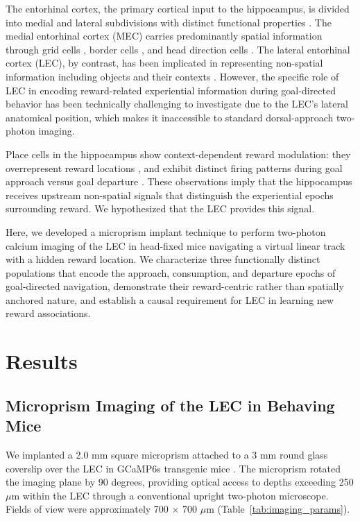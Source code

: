 \documentclass[11pt]{article}
\begin{document}
The entorhinal cortex, the primary cortical input to the hippocampus, is divided into medial and lateral subdivisions with distinct functional properties \citep{witter2017}. The medial entorhinal cortex (MEC) carries predominantly spatial information through grid cells \citep{hafting2005}, border cells \citep{solstad2008}, and head direction cells \citep{sargolini2006}. The lateral entorhinal cortex (LEC), by contrast, has been implicated in representing non-spatial information including objects and their contexts \citep{deshmukh2011, tsao2018, wang2018}. However, the specific role of LEC in encoding reward-related experiential information during goal-directed behavior has been technically challenging to investigate due to the LEC's lateral anatomical position, which makes it inaccessible to standard dorsal-approach two-photon imaging.

Place cells in the hippocampus show context-dependent reward modulation: they overrepresent reward locations \citep{hollup2001}, and exhibit distinct firing patterns during goal approach versus goal departure \citep{gauthier2018}. These observations imply that the hippocampus receives upstream non-spatial signals that distinguish the experiential epochs surrounding reward. We hypothesized that the LEC provides this signal.

Here, we developed a microprism implant technique to perform two-photon calcium imaging of the LEC in head-fixed mice navigating a virtual linear track with a hidden reward location. We characterize three functionally distinct populations that encode the approach, consumption, and departure epochs of goal-directed navigation, demonstrate their reward-centric rather than spatially anchored nature, and establish a causal requirement for LEC in learning new reward associations.

\section{Results}

\subsection{Microprism Imaging of the LEC in Behaving Mice}

We implanted a 2.0 mm square microprism attached to a 3 mm round glass coverslip over the LEC in GCaMP6s transgenic mice \citep{dana2014}. The microprism rotated the imaging plane by 90 degrees, providing optical access to depths exceeding 250 $\mu$m within the LEC through a conventional upright two-photon microscope. Fields of view were approximately 700 $\times$ 700 $\mu$m (Table~\ref{tab:imaging_params}).
\end{document}
